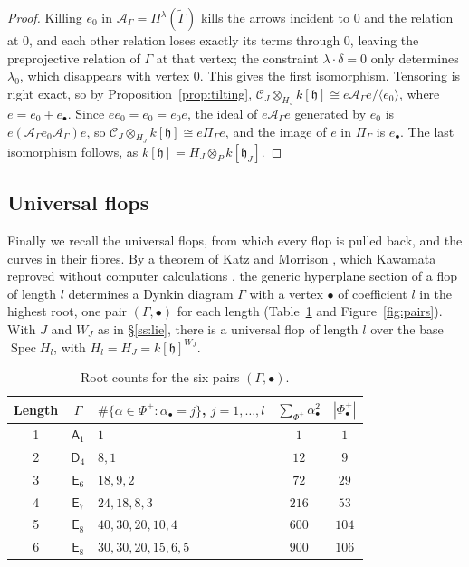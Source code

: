 \documentclass[11pt]{amsart}
\numberwithin{table}{section}
\numberwithin{figure}{section}
\numberwithin{equation}{section}
\theoremstyle{definition}
\theoremstyle{plain}
\newcommand{\cC}{\mathcal{C}}
\newcommand{\cA}{\mathcal{A}}
\newcommand{\h}{\mathfrak{h}}
\newcommand{\bul}{\bullet}
\newcommand{\tGamma}{\widetilde{\Gamma}}
\DeclareMathOperator{\Spec}{Spec}
\begin{document}
\begin{proof}
Killing $e_0$ in $\cA_\Gamma = \Pi^\lambda(\tGamma)$ kills the arrows incident to $0$ and the relation at $0$, and each other relation loses exactly its terms through $0$, leaving the preprojective relation of $\Gamma$ at that vertex; the constraint $\lambda\cdot\delta = 0$ only determines $\lambda_0$, which disappears with vertex $0$. This gives the first isomorphism. Tensoring is right exact, so by Proposition~\ref{prop:tilting}, $\cC_J \otimes_{H_J} k[\h] \cong e\cA_\Gamma e/\langle e_0\rangle$, where $e = e_0 + e_\bul$. Since $e e_0 = e_0 = e_0 e$, the ideal of $e\cA_\Gamma e$ generated by $e_0$ is $e(\cA_\Gamma e_0\cA_\Gamma)e$, so $\cC_J \otimes_{H_J} k[\h] \cong e\Pi_\Gamma e$, and the image of $e$ in $\Pi_\Gamma$ is $e_\bul$. The last isomorphism follows, as $k[\h] = H_J \otimes_P k[\h_J]$.
\end{proof}

\subsection{Universal flops}\label{ss:universal}

Finally we recall the universal flops, from which every flop is pulled back, and the curves in their fibres. By a theorem of Katz and Morrison \cite[\S1, Main Theorem and Corollary]{KM}, which Kawamata reproved without computer calculations \cite[Theorem]{Kaw94}, the generic hyperplane section of a flop of length $l$ determines a Dynkin diagram $\Gamma$ with a vertex $\bul$ of coefficient $l$ in the highest root, one pair $(\Gamma, \bul)$ for each length (Table~\ref{tab:roots} and Figure~\ref{fig:pairs}). With $J$ and $W_J$ as in \S\ref{ss:lie}, there is a universal flop of length $l$ over the base $\Spec H_l$, with $H_l = H_J = k[\h]^{W_J}$.

\begin{table}[ht]
\caption{Root counts for the six pairs $(\Gamma, \bul)$.}\label{tab:roots}
\begin{tabular}{@{}cclcc@{}}
\toprule
Length & $\Gamma$ & $\#\{\alpha \in \Phi^+ : \alpha_\bul = j\}$, $j = 1, \dots, l$ & $\sum_{\Phi^+} \alpha_\bul^2$ & $|\Phi^+_\bul|$ \\
\midrule
1 & $\mathsf{A}_1$ & $1$ & $1$ & $1$ \\
2 & $\mathsf{D}_4$ & $8, 1$ & $12$ & $9$ \\
3 & $\mathsf{E}_6$ & $18, 9, 2$ & $72$ & $29$ \\
4 & $\mathsf{E}_7$ & $24, 18, 8, 3$ & $216$ & $53$ \\
5 & $\mathsf{E}_8$ & $40, 30, 20, 10, 4$ & $600$ & $104$ \\
6 & $\mathsf{E}_8$ & $30, 30, 20, 15, 6, 5$ & $900$ & $106$ \\
\bottomrule
\end{tabular}
\end{table}
\end{document}
